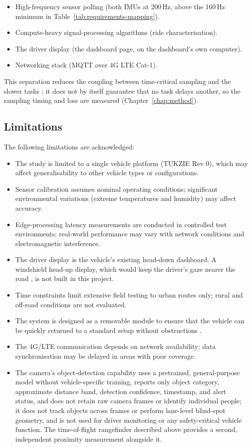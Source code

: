 \begin{itemize}
\item High-frequency sensor polling (both IMUs at 200\,Hz, above the 160\,Hz minimum in Table~\ref{tab:requirements-mapping}).
\item Compute-heavy signal-processing algorithms (ride characterisation).
\item The driver display (the dashboard page, on the dashboard's own computer).
\item Networking stack (MQTT over 4G LTE Cat-1).
\end{itemize}

This separation reduces the coupling between time-critical sampling and the slower tasks \cite{winberg2026}; it does not by itself guarantee that no task delays another, so the sampling timing and loss are measured (Chapter~\ref{chap:method}).

\subsection{Limitations}

The following limitations are acknowledged:

\begin{itemize}
\item The study is limited to a single vehicle platform (TUKZIE Rev 0), which may affect generalisability to other vehicle types or configurations.
\item Sensor calibration assumes nominal operating conditions; significant environmental variations (extreme temperatures and humidity) may affect accuracy.
\item Edge-processing latency measurements are conducted in controlled test environments; real-world performance may vary with network conditions and electromagnetic interference.
\item The driver display is the vehicle's existing head-down dashboard. A windshield head-up display, which would keep the driver's gaze nearer the road \cite{mareska2022}, is not built in this project.
\item Time constraints limit extensive field testing to urban routes only; rural and off-road conditions are not evaluated.
\item The system is designed as a removable module to ensure that the vehicle can be quickly returned to a standard setup without obstructions \cite{winberg2026}.
\item The 4G/LTE communication depends on network availability; data synchronisation may be delayed in areas with poor coverage.
\item The camera's object-detection capability uses a pretrained, general-purpose model without vehicle-specific training, reports only object category, approximate distance band, detection confidence, timestamp, and alert status, and does not retain raw camera frames or identify individual people; it does not track objects across frames or perform lane-level blind-spot geometry, and is not used for driver monitoring or any safety-critical vehicle function. The time-of-flight rangefinder described above provides a second, independent proximity measurement alongside it.
\end{itemize}

